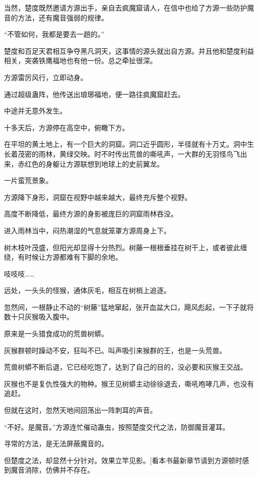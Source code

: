 
\begin{this_body}

当然，楚度既然邀请方源出手，亲自去疯魔窟请人，在信中也给了方源一些防护魔音的方法，还有魔音强弱的规律。

“不管如何，我都是要去一趟的。”

楚度和百足天君相互争夺黑凡洞天，这事情的源头就出自方源。并且他和楚度利益相关，突袭铁鹰福地也有他一份。总之牵扯很深。

方源雷厉风行，立即动身。

通过超级蛊阵，他传送出琅琊福地，便一路往疯魔窟赶去。

中途并无意外发生。

十多天后，方源停在高空中，俯瞰下方。

在平坦的黄土地上，有一个巨大的洞窟。洞口近乎圆形，半径就有十万丈。洞中生长着茂密的雨林，黄绿交映。时不时传出荒兽的嘶吼声，一大群的无羽怪鸟飞出来，赤红色的身躯让方源联想到地球上的史前翼龙。

一片蛮荒景象。

方源降下身形，洞窟在视野中越来越大，最终充斥整个视野。

高度不断降低，最终方源的身影被庞巨的洞窟雨林吞没。

进入雨林当中，闷热潮湿的气息就笼罩方源周身上下。

树木枝叶茂盛，但阳光却显得十分热烈。树藤一根根垂挂在树干上，或者彼此缠绕，有时候让方源都难有下脚的余地。

吱吱吱……

远处，一头头的怪猴，通体灰毛，相互在树梢上追逐。

忽然间，一根静止不动的“树藤”猛地窜起，张开血盆大口，飓风彪起，一下子就将数十只灰猴吸入腹中。

原来是一头猎食成功的荒兽树蟒。

灰猴群顿时躁动不安，狂叫不已。叫声吸引来猴群的王，也是一头荒兽。

荒兽树蟒不断后退，它已经吃饱了，达到了自己的目的，没必要和灰猴王交战。

灰猴也不是复仇性强大的物种。猴王见树蟒主动徐徐退去，嘶吼咆哮几声，也没有追赶。

但就在这时，忽然天地间回荡出一阵刺耳的声音。

“不好。是魔音。”方源连忙催动蛊虫，按照楚度交代之法，防御魔音灌耳。

寻常的方法，是无法屏蔽魔音的。

但楚度之法，却显然十分针对。效果立竿见影。[看本书最新章节请到方源顿时感到魔音消除，仿佛并不存在。


\end{this_body}
